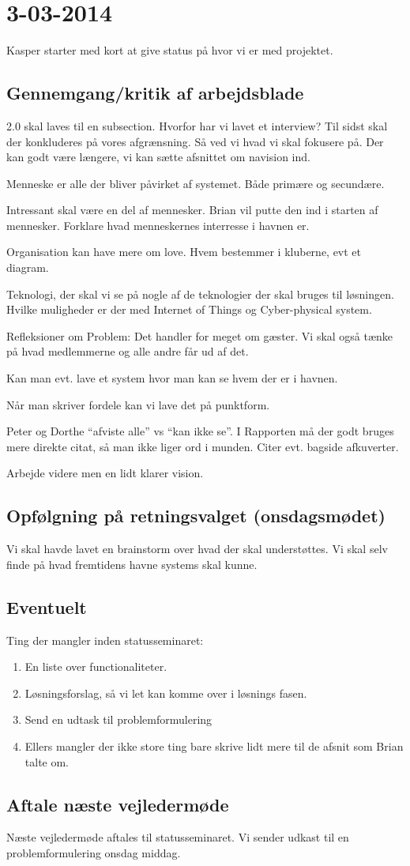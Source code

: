 \documentclass{article}
\begin{document}
\section{3-03-2014}
Kasper starter med kort at give status på hvor vi er med projektet.

\subsection{Gennemgang/kritik af arbejdsblade}
2.0 skal laves til en subsection. Hvorfor har vi lavet et interview? Til sidst skal der konkluderes på vores afgrænsning. Så ved vi hvad vi skal fokusere på. Der kan godt være længere, vi kan sætte afsnittet om navision ind.

Menneske er alle der bliver påvirket af systemet. Både primære og secundære.

Intressant skal være en del af mennesker. Brian vil putte den ind i starten af mennesker. Forklare hvad menneskernes interresse i havnen er.

Organisation kan have mere om love. Hvem bestemmer i kluberne, evt et diagram.

Teknologi, der skal vi se på nogle af de teknologier der skal bruges til løsningen. Hvilke muligheder er der med Internet of Things og Cyber-physical system.

Refleksioner om Problem: Det handler for meget om gæster. Vi skal også tænke på hvad medlemmerne og alle andre får ud af det.

Kan man evt. lave et system hvor man kan se hvem der er i havnen.

Når man skriver fordele kan vi lave det på punktform.

Peter og Dorthe “afviste alle” vs “kan ikke se”. I Rapporten må der godt bruges mere direkte citat, så man ikke liger ord i munden. Citer evt. bagside afkuverter.

Arbejde videre men en lidt klarer vision.

\subsection{Opfølgning på retningsvalget (onsdagsmødet)}
Vi skal havde lavet en brainstorm over hvad der skal understøttes. Vi skal selv finde på hvad fremtidens havne systems skal kunne.

\subsection{Eventuelt}
Ting der mangler inden statusseminaret:
\begin{enumerate}
    \item En liste over functionaliteter.
    \item Løsningsforslag, så vi let kan komme over i løsnings fasen.
    \item Send en udtask til problemformulering
    \item Ellers mangler der ikke store ting bare skrive lidt mere til de afsnit som Brian talte om.
\end{enumerate}

\subsection{Aftale næste vejledermøde}
Næste vejledermøde aftales til statusseminaret. Vi sender udkast til en problemformulering onsdag middag.
\end{document}
